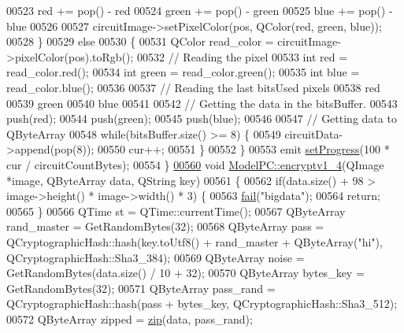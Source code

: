 \begin{DoxyCode}
00523         red += pop() - red %
00524         green += pop() - green %
00525         blue += pop() - blue %
00526 
00527         circuitImage->setPixelColor(pos, QColor(red, green, blue));
00528     \}
00529     \textcolor{keywordflow}{else}
00530     \{
00531         QColor read\_color = circuitImage->pixelColor(pos).toRgb();
00532         \textcolor{comment}{// Reading the pixel}
00533         \textcolor{keywordtype}{int} red = read\_color.red();
00534         \textcolor{keywordtype}{int} green = read\_color.green();
00535         \textcolor{keywordtype}{int} blue = read\_color.blue();
00536 
00537         \textcolor{comment}{// Reading the last bitsUsed pixels}
00538         red %
00539         green %
00540         blue %
00541 
00542         \textcolor{comment}{// Getting the data in the bitsBuffer.}
00543         push(red);
00544         push(green);
00545         push(blue);
00546 
00547         \textcolor{comment}{// Getting data to QByteArray}
00548         \textcolor{keywordflow}{while}(bitsBuffer.size() >= 8) \{
00549             circuitData->append(pop(8));
00550             cur++;
00551         \}
00552     \}
00553     emit \hyperlink{class_model_p_c_afdcd80f0ed5062e145a71f09b0897547}{setProgress}(100 * cur / circuitCountBytes);
00554 \}
\hypertarget{modelpc_8cpp_source.tex_l00560}{}\hyperlink{class_model_p_c_a4daefc3fb87a1f19172b9b20c987eb12}{00560} \textcolor{keywordtype}{void} \hyperlink{class_model_p_c_a4daefc3fb87a1f19172b9b20c987eb12}{ModelPC::encryptv1\_4}(QImage *image, QByteArray data, QString key)
00561 \{
00562     \textcolor{keywordflow}{if}(data.size() + 98 > image->height() * image->width() * 3) \{
00563         \hyperlink{class_model_p_c_a47464b59b7e37fcee25e55475708aabd}{fail}(\textcolor{stringliteral}{"bigdata"});
00564         \textcolor{keywordflow}{return};
00565     \}
00566     QTime st = QTime::currentTime();
00567     QByteArray rand\_master = GetRandomBytes(32);
00568     QByteArray pass = QCryptographicHash::hash(key.toUtf8() + rand\_master + QByteArray(\textcolor{stringliteral}{"hi"}), 
      QCryptographicHash::Sha3\_384);
00569     QByteArray noise = GetRandomBytes(data.size() / 10 + 32);
00570     QByteArray bytes\_key = GetRandomBytes(32);
00571     QByteArray pass\_rand = QCryptographicHash::hash(pass + bytes\_key, QCryptographicHash::Sha3\_512);
00572     QByteArray zipped = \hyperlink{class_model_p_c_afebbbfa4b07deba4f68fc6dfb50f353f}{zip}(data, pass\_rand);

\end{DoxyCode}

